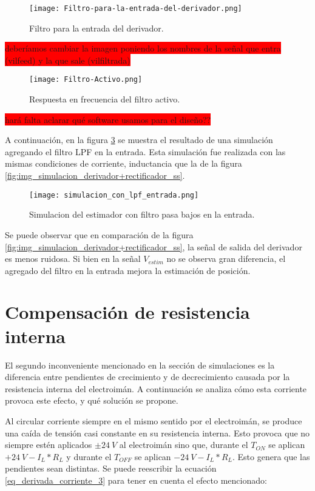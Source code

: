 \begin{figure}[H]
	\centering
	\texttt{[image: Filtro-para-la-entrada-del-derivador.png]}
	\caption{Filtro para la entrada del derivador.}
	\label{fig:img_Filtro-para-la-entrada-del-derivador}
\end{figure}

\colorbox{red}{deberíamos cambiar la imagen poniendo los nombres de la señal que entra (vilfeed) y la que sale (vilfiltrada)}
\begin{figure}[H]
	\centering
	\texttt{[image: Filtro-Activo.png]}
	\caption{Respuesta en frecuencia del filtro activo.}
	\label{fig:img_Respuesta-en-frecuencia-del-filtro-activo}
\end{figure}

\colorbox{red}{hará falta aclarar qué software usamos para el diseño??}

A continuación, en la figura \ref{fig:img_simulacion_lpf_entrada} se muestra el resultado de una simulación agregando el filtro LPF en la entrada. Esta simulación fue realizada con las mismas condiciones de corriente, inductancia que la de la figura \ref{fig:img_simulacion_derivador+rectificador_ss}.

\begin{figure}[H]
	\centering
	\texttt{[image: simulacion\_con\_lpf\_entrada.png]}
	\caption{Simulacion del estimador con filtro pasa 	bajos en la entrada.}
	\label{fig:img_simulacion_lpf_entrada}
\end{figure}

Se puede observar que en comparación de la figura \ref{fig:img_simulacion_derivador+rectificador_ss}, la señal de salida del derivador es menos ruidosa. Si bien en la señal $V_{estim}$ no se observa gran diferencia, el agregado del filtro en la entrada mejora la estimación de posición.

\section{Compensación de resistencia interna}

El segundo inconveniente mencionado en la sección de simulaciones es la diferencia entre pendientes de crecimiento y de decrecimiento causada por la resistencia interna del electroimán. A continuación se analiza cómo esta corriente provoca este efecto, y qué solución se propone.

Al circular corriente siempre en el mismo sentido por el electroimán, se produce una caída de tensión casi constante en su resistencia interna. Esto provoca que no siempre estén aplicados $\pm 24\:V$ al electroimán sino que, durante el $T_{ON}$ se aplican $+24\:V-I_L*R_L$ y durante el $T_{OFF}$ se aplican $-24\:V-I_L*R_L$. Esto genera que las pendientes sean distintas. Se puede reescribir la ecuación \ref{eq_derivada_corriente_3} para tener en cuenta el efecto mencionado:

